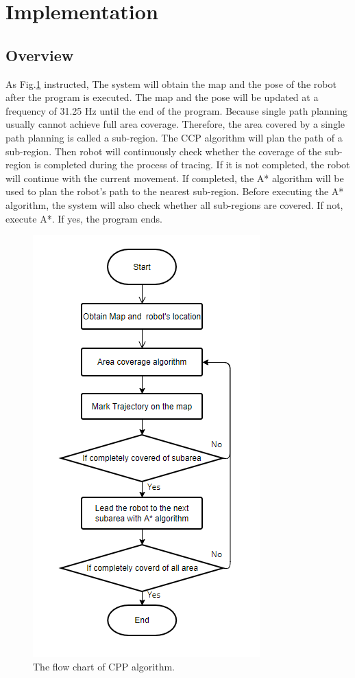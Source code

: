 \documentclass[conference]{IEEEtran}
\begin{document}
\section{Implementation}

\subsection{Overview}

As Fig.\ref{fig3} instructed, The system will obtain the map and the pose of the robot after the program is executed. The map and the pose will be updated at a frequency of 31.25 Hz until the end of the program. Because single path planning usually cannot achieve full area coverage. Therefore, the area covered by a single path planning is called a sub-region. The CCP algorithm will plan the path of a sub-region. Then robot will continuously check whether the coverage of the sub-region is completed during the process of tracing. If it is not completed, the robot will continue with the current movement. If completed, the A* algorithm will be used to plan the robot's path to the nearest sub-region. Before executing the A* algorithm, the system will also check whether all sub-regions are covered. If not, execute A*. If yes, the 
program ends.

\begin{figure}[htbp]
\setlength{\belowcaptionskip}{-1cm}
\centerline{\includegraphics[scale=0.6]{RS_Report/The Overall architecture of the CPP algorithm.png}}
\caption{The flow chart of CPP algorithm.}
\label{fig3}
\end{figure}
\end{document}
